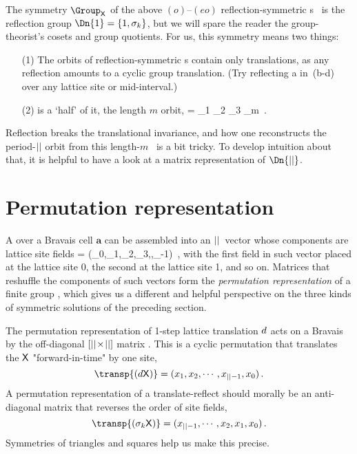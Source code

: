 The {\lattstate} {symmetry} $\Group_\Xx$  of the
above $(o)$--$(eo)$ reflection-symmetric {\lattstate}s \Xx\ is the reflection
group $\Dn{1}=\{1,\Refl_k\}$, but we will spare the reader the
group-theorist's cosets and group quotients. For us, this symmetry means
two things:
\begin{itemize}
  \item[(1)]
The \Dn{\infty} orbits of reflection-symmetric {\lattstate}s contain only
translations, as any reflection amounts to a cyclic group
\Cn{\cl{}} translation.
(Try reflecting a  {\lattstate} in \,(b-d)
over any lattice site or mid-interval.)
  \item[(2)]
{\lattstate} is a `half' of it, the length ${m}$ orbit,
\beq
\tilde{\Xx}      = \ssp_1 \ssp_2 \ssp_3 \cdots \ssp_{m}
\,.


\end{itemize}
Reflection breaks the translational invariance, and how one reconstructs
the period-${||}$ orbit from this length-$m$ \brick\ is a bit tricky. To
develop intuition about that, it is helpful to have a look at a matrix
representation of $\Dn{\cl{}}$.

\section{Permutation representation}
\label{sect:permReps}

A {\lattstate} {\Xx} over a Bravais cell $\mathbf{a}$ can be assembled
into an ${||}$\dmn\ vector whose components are lattice site fields
\beq
\transp{\Xx} = (\ssp_0,\ssp_1,\ssp_2,\ssp_3,\cdots,\ssp_{\cl{}-1})
\,,
with the first field in such vector placed at the lattice site 0, the
second at the lattice site 1, and so on. Matrices that reshuffle the
components of such vectors form the {\em permutation representation} of a
finite group \Group, which gives us a different and helpful
perspective on the three kinds of symmetric solutions of the preceding
section.

The permutation representation of 1-step lattice translation $d$
acts on a Bravais {\lattstate} by the off-diagonal
$[{||}\!\times\!{||}]$ matrix . This is a cyclic
\Cn{\cl{}} permutation that translates the {\lattstate} $\mathsf{X}$
"for\-ward-in-time" by one site,
\[
\transp{(\shift\Xx)}=(\ssp_1,\ssp_2,\cdots,\ssp_{\cl{}-1},\ssp_0)
\,.
\]
A permutation representation of a \Dn{\cl{}} translate-reflect should
morally be an anti-diagonal matrix that reverses the order of site
fields,
\[
\transp{(\Refl_k\Xx)}=(\ssp_{\cl{}-1},\cdots,\ssp_2,\ssp_1,\ssp_0)
\,.
\]
Symmetries of triangles and squares help us make this precise.

